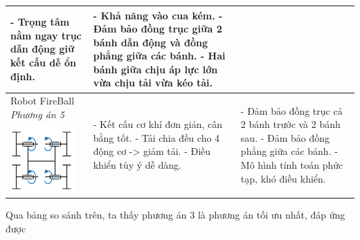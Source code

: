 \begin{longtable}{|p{4cm}|p{5cm}|p{5cm}|}
                - Trọng tâm nằm ngay trục dẫn động giữ kết cấu dễ ổn định. &
                - Khả năng vào cua kém. \newline
                - Đảm bảo đồng trục giữa 2 bánh dẫn động và đồng phẳng giữa các bánh. \newline
                - Hai bánh giữa chịu áp lực lớn vừa chịu tải vừa kéo tải. \\
                \hline
                Robot FireBall \newline
                \textit{Phương án 5} \newline
                \includegraphics[width=2.5cm]{pictures/chapter2/robot_fireball.png} &
                - Kết cấu cơ khí đơn giản, cân bằng tốt. \newline
                - Tải chia đều cho 4 động cơ -> giảm tải. \newline
                - Điều khiển tùy ý dễ dàng. &
                - Đảm bảo đồng trục cả 2 bánh trước và 2 bánh sau. \newline
                - Đảm bảo đồng phẳng giữa các bánh. \newline
                - Mô hình tính toán phức tạp, khó điều khiển. \\ 
            \end{longtable}
            \hspace*{0.6cm}Qua bảng so sánh trên, ta thấy phương án 3 là phương án tối ưu nhất, đáp ứng được